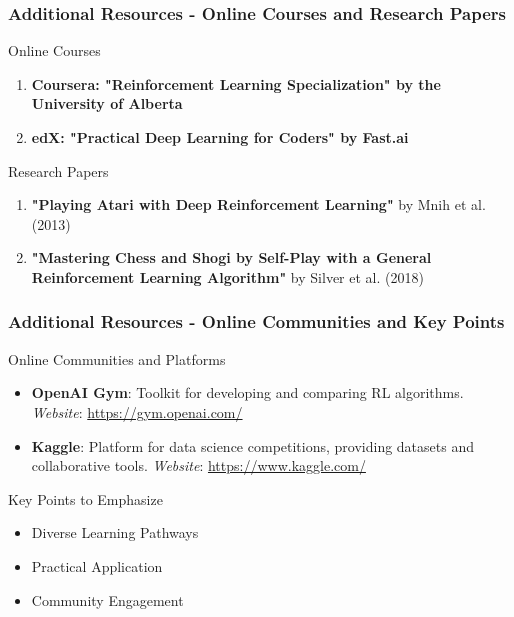 \documentclass[aspectratio=169]{beamer}
\begin{document}
\begin{frame}[fragile]
    \frametitle{Additional Resources - Online Courses and Research Papers}
    \begin{block}{Online Courses}
        \begin{enumerate}
            \item \textbf{Coursera: "Reinforcement Learning Specialization" by the University of Alberta}
            \item \textbf{edX: "Practical Deep Learning for Coders" by Fast.ai}
        \end{enumerate}
    \end{block}
    
    \begin{block}{Research Papers}
        \begin{enumerate}
            \item \textbf{"Playing Atari with Deep Reinforcement Learning"} by Mnih et al. (2013)
            \item \textbf{"Mastering Chess and Shogi by Self-Play with a General Reinforcement Learning Algorithm"} by Silver et al. (2018)
        \end{enumerate}
    \end{block}
\end{frame}

\begin{frame}[fragile]
    \frametitle{Additional Resources - Online Communities and Key Points}
    \begin{block}{Online Communities and Platforms}
        \begin{itemize}
            \item \textbf{OpenAI Gym}: Toolkit for developing and comparing RL algorithms. \textit{Website}: \url{https://gym.openai.com/}
            \item \textbf{Kaggle}: Platform for data science competitions, providing datasets and collaborative tools. \textit{Website}: \url{https://www.kaggle.com/}
        \end{itemize}
    \end{block}
    
    \begin{block}{Key Points to Emphasize}
        \begin{itemize}
            \item Diverse Learning Pathways
            \item Practical Application
            \item Community Engagement
        \end{itemize}
    \end{block}
\end{frame}
\end{document}

